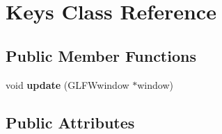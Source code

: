 \hypertarget{classKeys}{\section{Keys Class Reference}
\label{classKeys}
}
\subsection*{Public Member Functions}
\begin{DoxyCompactItemize}
\item 
\hypertarget{classKeys_ad80e837b58e7bbd350b0a6030c589daa}{void {\bfseries update} (G\-L\-F\-Wwindow $\ast$window)}\label{classKeys_ad80e837b58e7bbd350b0a6030c589daa}

\end{DoxyCompactItemize}
\subsection*{Public Attributes}
